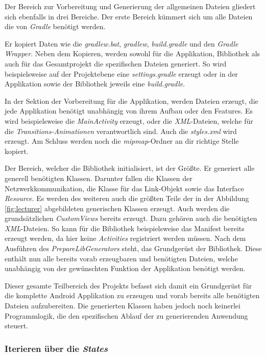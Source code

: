 Der Bereich zur Vorbereitung und Generierung der allgemeinen Dateien gliedert sich ebenfalls in drei Bereiche. Der erste Bereich kümmert sich um alle Dateien die von \textit{Gradle} benötigt werden. 

Er kopiert Daten wie die \textit{gradlew.bat}, \textit{gradlew}, \textit{build.gradle} und den \textit{Gradle Wrapper}. 
Neben dem Kopieren, werden sowohl für die Applikation, Bibliothek als auch für das Gesamtprojekt die spezifischen Dateien generiert. So wird beispielsweise auf der Projektebene eine \textit{settings.gradle} erzeugt oder in der Applikation sowie der Bibliothek jeweils eine \textit{build.gradle}.

In der Sektion der Vorbereitung für die Applikation, werden Dateien erzeugt, die jede Applikation benötigt unabhängig von ihrem Aufbau oder den Features. Es wird beispielsweise die \textit{MainActivity} erzeugt, oder die \textit{XML}-Dateien, welche für die \textit{Transitions-Animationen} verantwortlich sind. Auch die \textit{styles.xml} wird erzeugt. Am Schluss werden noch die \textit{mipmap}-Ordner an dir richtige Stelle kopiert.

Der Bereich, welcher die Bibliothek initialisiert, ist der Größte. Er generiert alle generell benötigten Klassen. Darunter fallen die Klassen der Netzwerkkommunikation, die Klasse für das Link-Objekt sowie das Interface \textit{Resource}. Es werden des weiteren auch die größten Teile der in der Abbildung \ref{fig:lecturer} abgebildeten generischen Klassen erzeugt. Auch werden die grundsätzlichen \textit{CustomViews} bereits erzeugt. Dazu gehören auch die benötigten \textit{XML}-Dateien. So kann für die Bibliothek beispielsweise das Manifest bereits erzeugt werden, da hier keine \textit{Activities} registriert werden müssen. Nach dem Ausführen des \textit{PrepareLibGenerators} steht, das Grundgerüst der Bibliothek. Diese enthält nun alle bereits vorab erzeugbaren und benötigten Dateien, welche unabhängig von der gewünschten Funktion der Applikation benötigt werden. 

Dieser gesamte Teilbereich des Projekts befasst sich damit ein Grundgerüst für die komplette Android Applikation zu erzeugen und vorab bereits alle benötigten Dateien aufzubereiten. Die generierten Klassen haben jedoch noch keinerlei Programmlogik, die den spezifischen Ablauf der zu generierenden Anwendung steuert.

\subsubsection{Iterieren über die \textit{States}}

